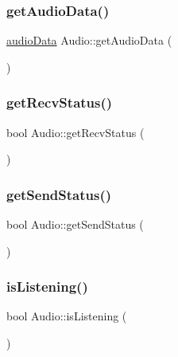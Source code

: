 \subsubsection{\texorpdfstring{get\+Audio\+Data()}{getAudioData()}}
{\footnotesize\ttfamily \hyperlink{structaudioData}{audio\+Data} Audio\+::get\+Audio\+Data (\begin{DoxyParamCaption}{ }\end{DoxyParamCaption})}

\mbox{\label{classAudio_a5017e5dd1eb6695e880535054e05d1e6}} 
\subsubsection{\texorpdfstring{get\+Recv\+Status()}{getRecvStatus()}}
{\footnotesize\ttfamily bool Audio\+::get\+Recv\+Status (\begin{DoxyParamCaption}{ }\end{DoxyParamCaption})}

\mbox{\label{classAudio_a397b2ca56d953632f183d5a6d62f564f}} 
\subsubsection{\texorpdfstring{get\+Send\+Status()}{getSendStatus()}}
{\footnotesize\ttfamily bool Audio\+::get\+Send\+Status (\begin{DoxyParamCaption}{ }\end{DoxyParamCaption})}

\mbox{\label{classAudio_a3daea1aa8c67413ca520fd49688c799e}} 
\subsubsection{\texorpdfstring{is\+Listening()}{isListening()}}
{\footnotesize\ttfamily bool Audio\+::is\+Listening (\begin{DoxyParamCaption}{ }\end{DoxyParamCaption})}

\mbox{\label{classAudio_a871e82444419a2b5a9604d65fee23684}} 
